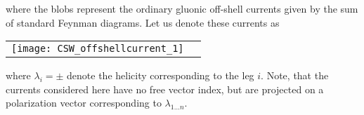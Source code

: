 \documentclass[english,american]{article}
\newcommand\myref{\refstepcounter{equation}\theequation}
\newcommand{\refmyref}[1]{\newcounter{#1}\setcounter{#1}{\theequation}}
\begin{document}
\noindent where the blobs represent the ordinary gluonic off-shell
currents given by the sum of standard Feynman diagrams. Let us denote
these currents as

\begin{flushleft}
\begin{tabular}{>{\centering}m{}>{\centering}m{}}
\bigskip{}


\raggedright{}\centerline{\texttt{[image: CSW\_offshellcurrent\_1]}} & \centering{}\centering{(\myref )}
\refmyref{offshell_current_diag}\tabularnewline
\end{tabular}
\par\end{flushleft}

\noindent where $\lambda_{i}=\pm$ denote the helicity corresponding
to the leg $i$. Note, that the currents considered here have no free
vector index, but are projected on a polarization vector corresponding
to $\lambda_{1\dots n}$.
\end{document}
